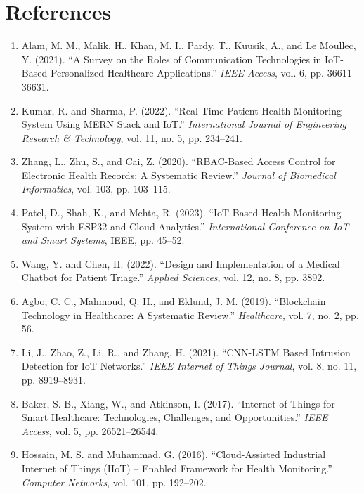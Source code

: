 \chapter{References}

\begin{enumerate}[leftmargin=*]

\item Alam, M. M., Malik, H., Khan, M. I., Pardy, T., Kuusik, A., and Le Moullec, Y. (2021). ``A Survey on the Roles of Communication Technologies in IoT-Based Personalized Healthcare Applications.'' \textit{IEEE Access}, vol. 6, pp. 36611--36631.

\item Kumar, R. and Sharma, P. (2022). ``Real-Time Patient Health Monitoring System Using MERN Stack and IoT.'' \textit{International Journal of Engineering Research \& Technology}, vol. 11, no. 5, pp. 234--241.

\item Zhang, L., Zhu, S., and Cai, Z. (2020). ``RBAC-Based Access Control for Electronic Health Records: A Systematic Review.'' \textit{Journal of Biomedical Informatics}, vol. 103, pp. 103--115.

\item Patel, D., Shah, K., and Mehta, R. (2023). ``IoT-Based Health Monitoring System with ESP32 and Cloud Analytics.'' \textit{International Conference on IoT and Smart Systems}, IEEE, pp. 45--52.

\item Wang, Y. and Chen, H. (2022). ``Design and Implementation of a Medical Chatbot for Patient Triage.'' \textit{Applied Sciences}, vol. 12, no. 8, pp. 3892.

\item Agbo, C. C., Mahmoud, Q. H., and Eklund, J. M. (2019). ``Blockchain Technology in Healthcare: A Systematic Review.'' \textit{Healthcare}, vol. 7, no. 2, pp. 56.

\item Li, J., Zhao, Z., Li, R., and Zhang, H. (2021). ``CNN-LSTM Based Intrusion Detection for IoT Networks.'' \textit{IEEE Internet of Things Journal}, vol. 8, no. 11, pp. 8919--8931.

\item Baker, S. B., Xiang, W., and Atkinson, I. (2017). ``Internet of Things for Smart Healthcare: Technologies, Challenges, and Opportunities.'' \textit{IEEE Access}, vol. 5, pp. 26521--26544.

\item Hossain, M. S. and Muhammad, G. (2016). ``Cloud-Assisted Industrial Internet of Things (IIoT) -- Enabled Framework for Health Monitoring.'' \textit{Computer Networks}, vol. 101, pp. 192--202.


\end{enumerate}
